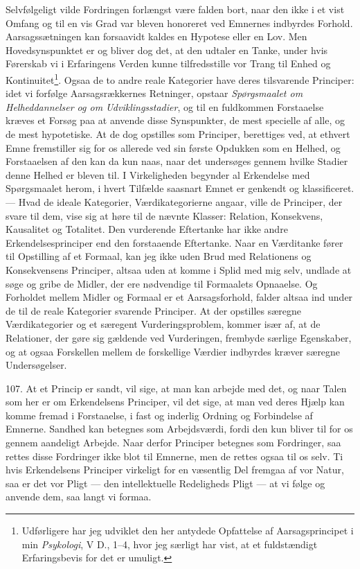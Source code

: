 \documentclass[12pt,a4paper]{book}
\newcommand{\apage}[1]{\marginnote{\footnotesize\textit{[#1]}}}
\begin{document}
Selvfølgeligt vilde Fordringen forlængst være falden bort, naar den ikke i et vist
Omfang og til en vis Grad var bleven honoreret ved Emnernes indbyrdes Forhold.
Aarsagssætningen kan forsaavidt kaldes en Hypotese eller en Lov. Men
Hovedsynspunktet er og bliver dog det, at den udtaler en Tanke, under hvis
Førerskab vi i Erfaringens Verden kunne tilfredsstille vor Trang til Enhed og
Kontinuitet\footnote{Udførligere har jeg udviklet den her antydede Opfattelse af
Aarsagsprincipet i min \emph{Psykologi}, V D., 1--4, hvor jeg særligt har vist, at
et fuldstændigt Erfaringsbevis for det er umuligt.}. Ogsaa de to andre reale
Kategorier have deres tilsvarende Principer: idet vi forfølge Aarsagsrækkernes
Retninger, opstaar \emph{Spørgsmaalet om Helheddannelser og om Udviklingsstadier},
og til en fuldkommen Forstaaelse kræves et Forsøg paa at anvende disse Synspunkter,
de mest specielle af alle, og de mest hypotetiske. At de dog opstilles som
Principer, berettiges ved, at ethvert Emne fremstiller \apage{257} sig for os allerede ved sin
første Opdukken som en Helhed, og Forstaaelsen af den kan da kun naas, naar det
undersøges gennem hvilke Stadier denne Helhed er bleven til. I Virkeligheden
begynder al Erkendelse med Spørgsmaalet herom, i hvert Tilfælde saasnart Emnet er
genkendt og klassificeret. --- Hvad de ideale Kategorier, Værdikategorierne angaar,
ville de Principer, der svare til dem, vise sig at høre til de nævnte Klasser:
Relation, Konsekvens, Kausalitet og Totalitet. Den vurderende Eftertanke har ikke
andre Erkendelsesprinciper end den forstaaende Eftertanke. Naar en Værditanke fører
til Opstilling af et Formaal, kan jeg ikke uden Brud med Relationens og
Konsekvensens Principer, altsaa uden at komme i Splid med mig selv, undlade at søge
og gribe de Midler, der ere nødvendige til Formaalets Opnaaelse. Og Forholdet
mellem Midler og Formaal er et Aarsagsforhold, falder altsaa ind under de til de
reale Kategorier svarende Principer. At der opstilles særegne Værdikategorier og et
særegent Vurderingsproblem, kommer især af, at de Relationer, der gøre sig
gældende ved Vurderingen, frembyde særlige Egenskaber, og at ogsaa Forskellen
mellem de forskellige Værdier indbyrdes kræver særegne Undersøgelser.

107. At et Princip er sandt, vil sige, at man kan arbejde med det, og naar Talen
som her er om Erkendelsens Principer, vil det sige, at man ved deres Hjælp kan
komme fremad i Forstaaelse, i fast og inderlig Ordning og Forbindelse af Emnerne.
Sandhed kan betegnes som Arbejdsværdi, fordi den kun bliver til for os gennem
aandeligt Arbejde. Naar derfor Principer betegnes som Fordringer, saa rettes disse
Fordringer ikke blot til Emnerne, men de rettes ogsaa til os selv. Ti hvis
Erkendelsens Principer virkeligt for en væsentlig Del fremgaa af vor Natur, saa er
det vor Pligt --- den intellektuelle Redeligheds Pligt --- at vi følge og anvende
dem, saa langt vi formaa.
\end{document}

